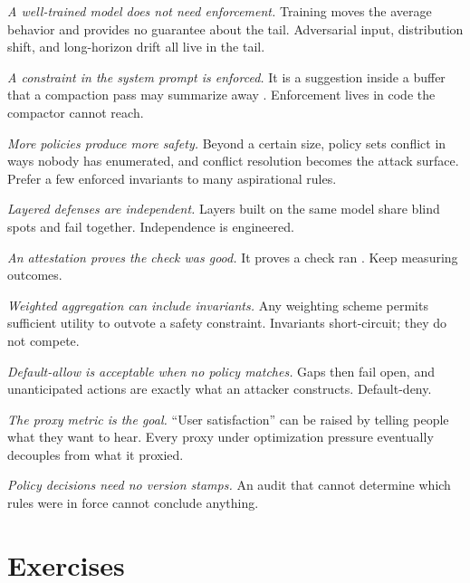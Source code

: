 \documentclass[11pt]{book}
\begin{document}
\textit{A well-trained model does not need enforcement.} Training moves the average behavior and provides no guarantee about the tail. Adversarial input, distribution shift, and long-horizon drift all live in the tail.

\textit{A constraint in the system prompt is enforced.} It is a suggestion inside a buffer that a compaction pass may summarize away \cite{govdecay2026}. Enforcement lives in code the compactor cannot reach.

\textit{More policies produce more safety.} Beyond a certain size, policy sets conflict in ways nobody has enumerated, and conflict resolution becomes the attack surface. Prefer a few enforced invariants to many aspirational rules.

\textit{Layered defenses are independent.} Layers built on the same model share blind spots and fail together. Independence is engineered.

\textit{An attestation proves the check was good.} It proves a check ran \cite{proofguardrail2026}. Keep measuring outcomes.

\textit{Weighted aggregation can include invariants.} Any weighting scheme permits sufficient utility to outvote a safety constraint. Invariants short-circuit; they do not compete.

\textit{Default-allow is acceptable when no policy matches.} Gaps then fail open, and unanticipated actions are exactly what an attacker constructs. Default-deny.

\textit{The proxy metric is the goal.} ``User satisfaction'' can be raised by telling people what they want to hear. Every proxy under optimization pressure eventually decouples from what it proxied.

\textit{Policy decisions need no version stamps.} An audit that cannot determine which rules were in force cannot conclude anything.

\section*{Exercises}
\end{document}
